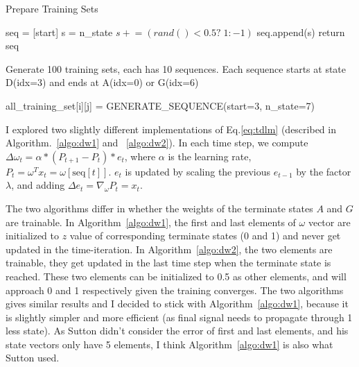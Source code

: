 \documentclass[conference]{IEEEtran}
\newcommand{\pluseq}{\mathrel{+}=}
\begin{document}
	
	\begin{algorithm}[h!]
		\caption{Prepare Training Sets}
		\begin{algorithmic}
			\State seq = [start]
			\State s = n\_state
			\State $s \pluseq (rand()<0.5?\; 1: -1)$
			\State seq.append(s)
			\EndWhile
			\State return seq
			\EndFunction
			
			\Comment Generate 100 training sets, each has 10 sequences. Each sequence starts at state D(idx=3) and ends at A(idx=0) or G(idx=6)
			
			\State all\_training\_set[i][j] = GENERATE\_SEQUENCE(start=3, n\_state=7)
			\EndFor
			\EndFor
			
		\end{algorithmic}
		\label{algo:seq}
	\end{algorithm}
	
	I explored two slightly different implementations of Eq.\ref{eq:tdlm} (described in Algorithm.~\ref{algo:dw1} and ~\ref{algo:dw2}). In each time step, we compute $\Delta \omega_t = \alpha * (P_{t+1}-P_t) * e_t$, where $\alpha$ is the learning rate, $P_t = \omega^T x_t = \omega[\mathrm{seq}[t]]$. $e_t$ is updated by scaling the previous $e_{t-1}$ by the factor $\lambda$, and adding $\Delta e_t = \nabla_\omega P_t = x_t$.
	
	The two algorithms differ in whether the weights of the terminate states $A$ and $G$ are trainable. In Algorithm~\ref{algo:dw1}, the first and last elements of $\omega$ vector are initialized to $z$ value of corresponding terminate states (0 and 1) and never get updated in the time-iteration. In Algorithm~\ref{algo:dw2}, the two elements are trainable, they get updated in the last time step when the terminate state is reached. These two elements can be initialized to 0.5 as other elements, and will approach 0 and 1 respectively given the training converges. The two algorithms gives similar results and I decided to stick with Algorithm~\ref{algo:dw1}, because it is slightly simpler and more efficient (as final signal needs to propagate through 1 less state). As Sutton didn't consider the error of first and last elements, and his state vectors only have 5 elements, I think Algorithm~\ref{algo:dw1} is also what Sutton used.
	
\end{document}
